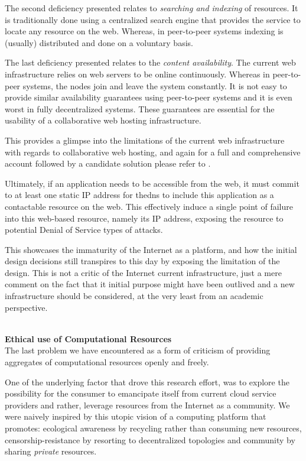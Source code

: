 \documentclass[12pt, titlepage]{uo_temp}
\begin{document}
     The second deficiency presented relates to \emph{searching and indexing} of
     resources. It is traditionally done using a centralized search engine that provides
     the service to locate any resource on the web. Whereas, in peer-to-peer systems
     indexing is (usually) distributed and done on a voluntary basis.
     
     The last deficiency presented relates to the \emph{content availability}. The current
     web infrastructure relies on web servers to be online continuously.  Whereas in
     peer-to-peer systems, the nodes join and leave the system constantly. It is not easy
     to provide similar availability guarantees using peer-to-peer systems and it is even
     worst in fully decentralized systems. These guarantees are essential for the
     usability of a collaborative web hosting infrastructure.
     
     This provides a glimpse into the limitations of the current web infrastructure with
     regards to collaborative web hosting, and again for a full and comprehensive account
     followed by a candidate solution please refer to \cite{ahmed2014collaborative}.

     Ultimately, if an application needs to be accessible from the web, it must commit to
     at least one static IP address for the\gls{dns} to include this application as a
     contactable resource on the web. This effectively induce a single point of failure
     into this web-based resource, namely its IP address, exposing the resource to
     potential Denial of Service types of attacks.

     This showcases the immaturity of the Internet as a platform, and how the initial design decisions
     still transpires to this day by exposing the limitation of the design. This is not a
     critic of the Internet current infrastructure, just a mere comment on the fact that it
     initial purpose might have been outlived and a new infrastructure should be
     considered, at the very least from an academic perspective.

     \\ \textbf{Ethical use of Computational Resources}
     \\ The last problem we have encountered as a form of criticism of providing
     aggregates of computational resources openly and freely. 

     One of the underlying factor that drove this research effort, was to explore the
     possibility for the consumer to emancipate itself from current cloud service
     providers and rather, leverage resources from the Internet as a community.
     We were naively inspired by this utopic vision of a computing platform that promotes:
     ecological awareness by recycling rather than consuming new resources,
     censorship-resistance by resorting to decentralized topologies and community by
     sharing \emph{private} resources.
     
\end{document}
